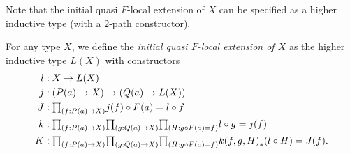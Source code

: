 Note that the initial quasi $F$-local extension of $X$ can be specified as a higher inductive type (with a $2$-path constructor).

\begin{defn}
For any type $X$, we define the \emph{initial quasi $F$-local extension of $X$} as
the higher inductive type $L(X)$ with constructors
\begin{align*}
l & : X\to L(X) \\
j & : (P(a)\to X) \to (Q(a)\to L(X)) \\
J & : \prd{f:P(a)\to X} j(f)\circ F(a) = l\circ f \\
k & : \prd{f:P(a)\to X}{g:Q(a)\to X}{H:g\circ F(a)=f} l\circ g = j(f) \\
K & : \prd{f:P(a)\to X}{g:Q(a)\to X}{H:g\circ F(a)=f} \trans{k(f,g,H)}{l\circ H} = J(f).
\end{align*}
\end{defn}

\begin{comment}
\begin{lem}
Let $X$ be a type. For any $f:P(a)\to X$, the homotopy fiber 
$\hfib{\psi_{L(X)}(a)}{l\circ f}$ is equivalent to the higher inductive type 
with type constructors
\begin{align*}
i & : \hfib{\psi_X(a)}{f}\to\hfib{\psi_{L(X)}(a)}{l\circ f} \\
c & : \hfib{\psi_{L(X)}(a)}{l\circ f} \\
p & : \prd{h:\hfib{\psi_X(a)}{f}}\id{i(h)}{c}.
\end{align*}
\end{lem}

\begin{proof}
We define $c\defeq\pairr{j(f),J(f)}$ and $p\defeq\pairr{k(f),K(f)}$.
\end{proof}

\begin{cor}\label{cor}
For any type $X$ and $f:P(a)\to X$, we have
\begin{equation*}
\iscontr(\hfib{\psi_{L(X)}(a)}{l\circ f}).
\end{equation*}
\end{cor}

\begin{proof}
Let $X$ be a type and let $f:P(a)\to X$. Then $\hfib{\psi_{L(X)}(a)}{l\circ f}$
fits in the pushout diagram
\begin{equation*}
\begin{tikzcd}
\hfib{\psi_X(a)}{f} \arrow[r] \arrow[d,equals] & \unit \arrow[d] \\
\hfib{\psi_X(a)}{f} \arrow[r] & \hfib{\psi_{L(X)}(a)}{l\circ f}
\end{tikzcd}
\end{equation*}
so the arrow going down on the right is an equivalence.
\end{proof}
\end{comment}

